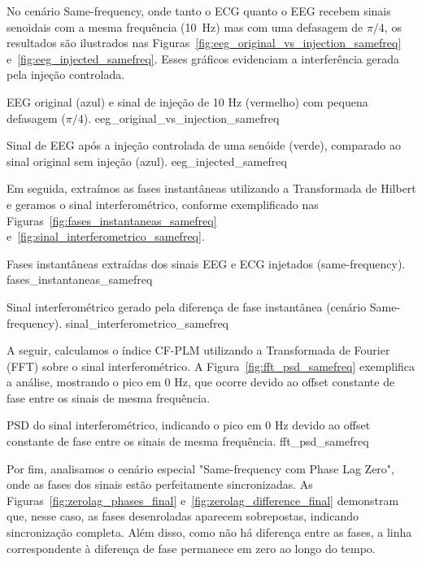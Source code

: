 No cenário Same-frequency, onde tanto o ECG quanto o EEG recebem sinais senoidais com a mesma frequência (10~Hz) mas com uma defasagem de \(\pi/4\), os resultados são ilustrados nas Figuras~\ref{fig:eeg_original_vs_injection_samefreq} e~\ref{fig:eeg_injected_samefreq}. Esses gráficos evidenciam a interferência gerada pela injeção controlada.

{EEG original (azul) e sinal de injeção de 10 Hz (vermelho) com pequena defasagem (\(\pi/4\)).}
{eeg_original_vs_injection_samefreq}

{Sinal de EEG após a injeção controlada de uma senóide (verde), comparado ao sinal original sem injeção (azul).}
{eeg_injected_samefreq}


Em seguida, extraímos as fases instantâneas utilizando a Transformada de Hilbert e geramos o sinal interferométrico, conforme exemplificado nas Figuras~\ref{fig:fases_instantaneas_samefreq} e~\ref{fig:sinal_interferometrico_samefreq}.

{Fases instantâneas extraídas dos sinais EEG e ECG injetados (same-frequency).}
{fases_instantaneas_samefreq}

{Sinal interferométrico gerado pela diferença de fase instantânea (cenário Same-frequency).}
{sinal_interferometrico_samefreq}


A seguir, calculamos o índice CF-PLM utilizando a Transformada de Fourier (FFT) sobre o sinal interferométrico. A Figura~\ref{fig:fft_psd_samefreq} exemplifica a análise, mostrando o pico em 0 Hz, que ocorre devido ao offset constante de fase entre os sinais de mesma frequência.

{PSD do sinal interferométrico, indicando o pico em 0 Hz devido ao offset constante de fase entre os sinais de mesma frequência.}
{fft_psd_samefreq}

Por fim, analisamos o cenário especial "Same-frequency com Phase Lag Zero", onde as fases dos sinais estão perfeitamente sincronizadas. As Figuras~\ref{fig:zerolag_phases_final} e~\ref{fig:zerolag_difference_final} demonstram que, nesse caso, as fases desenroladas aparecem sobrepostas, indicando sincronização completa. Além disso, como não há diferença entre as fases, a linha correspondente à diferença de fase permanece em zero ao longo do tempo.

